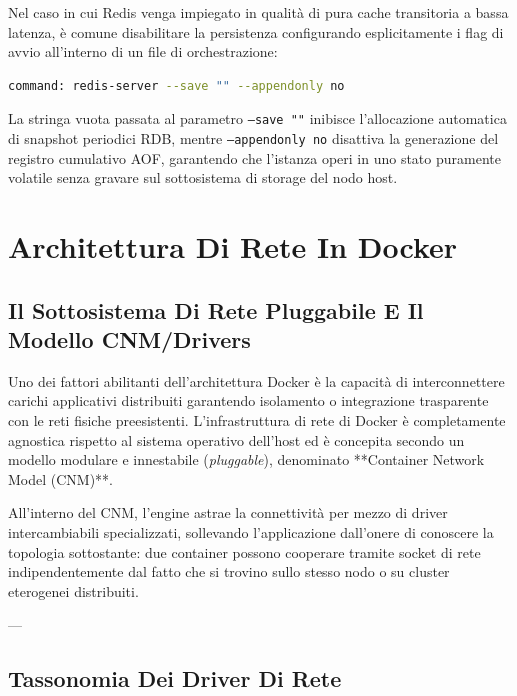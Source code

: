\documentclass[11pt, a4paper]{article}
\begin{document}
Nel caso in cui Redis venga impiegato in qualità di pura cache transitoria a bassa latenza, è comune disabilitare la persistenza configurando esplicitamente i flag di avvio all'interno di un file di orchestrazione:
\begin{lstlisting}[language=bash]
command: redis-server --save "" --appendonly no
\end{lstlisting}
La stringa vuota passata al parametro \texttt{--save ""} inibisce l'allocazione automatica di snapshot periodici RDB, mentre \texttt{--appendonly no} disattiva la generazione del registro cumulativo AOF, garantendo che l'istanza operi in uno stato puramente volatile senza gravare sul sottosistema di storage del nodo host.

\newpage


\section{Architettura Di Rete In Docker}

\subsection{Il Sottosistema Di Rete Pluggabile E Il Modello CNM/Drivers}

Uno dei fattori abilitanti dell'architettura Docker è la capacità di interconnettere carichi applicativi distribuiti garantendo isolamento o integrazione trasparente con le reti fisiche preesistenti. L'infrastruttura di rete di Docker è completamente agnostica rispetto al sistema operativo dell'host ed è concepita secondo un modello modulare e innestabile (\emph{pluggable}), denominato **Container Network Model (CNM)**.

All'interno del CNM, l'engine astrae la connettività per mezzo di driver intercambiabili specializzati, sollevando l'applicazione dall'onere di conoscere la topologia sottostante: due container possono cooperare tramite socket di rete indipendentemente dal fatto che si trovino sullo stesso nodo o su cluster eterogenei distribuiti.

---

\subsection{Tassonomia Dei Driver Di Rete}
\end{document}

